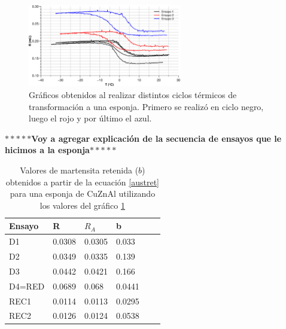 \documentclass[a4paper,12pt,fleqn,twoside,openany]{book}
\begin{document}
 \begin{figure}[h]
 \centering
 \includegraphics[width=0.6\textwidth]{Img/Resultados/Resistencia/RED_resultados.eps}
 \caption{Gráficos obtenidos al realizar distintos ciclos térmicos de transformación a una esponja. Primero se realizó en ciclo negro, luego el rojo y por último el azul.} 
 \label{fig:RED_resultados}
 \end{figure}
 

\vspace{5mm} %
\textbf{$*****$Voy a agregar explicación de la secuencia de ensayos que le hicimos a la esponja$*****$}
\vspace{5mm} %


\begin{table} 
\begin{center} 
\begin{tabular}{@{}llllll@{}} \toprule
Ensayo   &    R    &  ${R_A}$ &  b \\ \midrule
 D1       &  0.0308  & 0.0305   & 0.033  \\
 D2       &  0.0349  & 0.0335  &  0.139  \\
 D3       &  0.0442  & 0.0421  &  0.166  \\
 D4=RED      &  0.0689 &	0.068 &	0.0441 \\
REC1      &  0.0114 &	0.0113 & 0.0295 \\
REC2      &  0.0126 &	0.0124 & 0.0538\\
 \bottomrule

 \end{tabular}
\caption{Valores de martensita retenida ($b$) obtenidos a partir de la ecuación \ref{austret} para una esponja de CuZnAl utilizando los valores del gráfico \ref{fig:RED_resultados} }
\label{tab:b}
\end{center}
\end{table}



 
\end{document}

